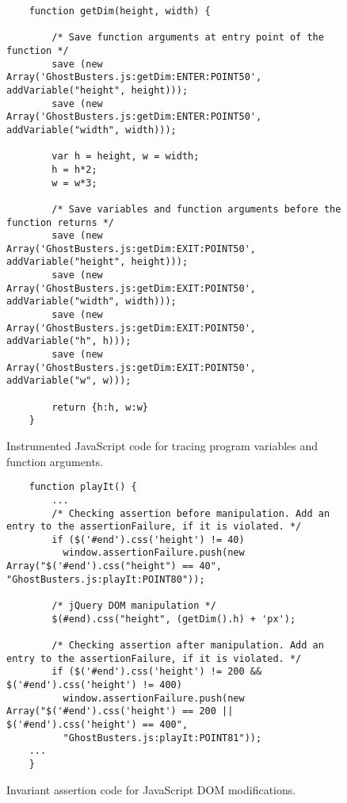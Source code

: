 \begin{figure}
\medskip
\begin{lstlisting}
	function getDim(height, width) {
		
		/* Save function arguments at entry point of the function */
		save (new Array('GhostBusters.js:getDim:ENTER:POINT50', addVariable("height", height)));
		save (new Array('GhostBusters.js:getDim:ENTER:POINT50', addVariable("width", width))); 

		var h = height, w = width;		
 		h = h*2;
 		w = w*3;		
 		
		/* Save variables and function arguments before the function returns */
		save (new Array('GhostBusters.js:getDim:EXIT:POINT50', addVariable("height", height)));
		save (new Array('GhostBusters.js:getDim:EXIT:POINT50', addVariable("width", width)));
		save (new Array('GhostBusters.js:getDim:EXIT:POINT50', addVariable("h", h)));
		save (new Array('GhostBusters.js:getDim:EXIT:POINT50', addVariable("w", w)));
	
		return {h:h, w:w}
	}	

\end{lstlisting}
\caption{Instrumented JavaScript code for tracing program variables and function arguments.}
\label{Fig:example_var_instrumentation}
\end{figure}

  


\begin{figure}
\medskip
\begin{lstlisting}
	function playIt() {
		...	
		/* Checking assertion before manipulation. Add an entry to the assertionFailure, if it is violated. */
		if ($('#end').css('height') != 40)
  		  window.assertionFailure.push(new Array("$('#end').css("height") == 40", "GhostBusters.js:playIt:POINT80")); 
	
		/* jQuery DOM manipulation */
		$(#end).css("height", (getDim().h) + 'px');
	
		/* Checking assertion after manipulation. Add an entry to the assertionFailure, if it is violated. */
		if ($('#end').css('height') != 200 && $('#end').css('height') != 400)
  		  window.assertionFailure.push(new Array("$('#end').css('height') == 200 || $('#end').css('height') == 400", 											  
  		  "GhostBusters.js:playIt:POINT81")); 	
  	...
	}	

\end{lstlisting}
\caption{Invariant assertion code for JavaScript DOM modifications.}
\label{Fig:example_dom_assertion}
\end{figure}


